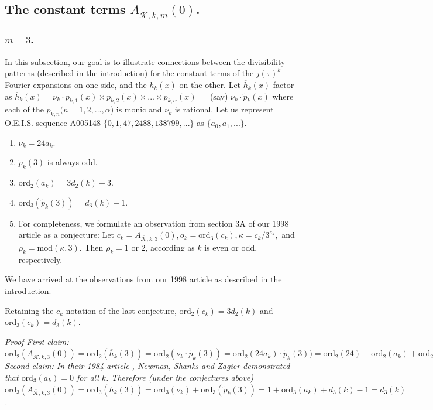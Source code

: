 \documentclass{article}
\begin{document}
\subsection[]{The constant terms 
$A_{\overline{\mathcal{K}},k,m}(0)$.
} 
\subsubsection[]{$m = 3$.}
In this subsection, our goal is to illustrate
connections between the divisibility
patterns (described in the
introduction)
for the constant terms of the
$j(\tau)^k$ Fourier expansions 
on one side,
and the $h_k(x)$ on the other.
Let $\overline{h}_k(x)$ factor as 
$\overline{h}_k(x) = 
\nu_k\cdot p_{k,1}(x) \times p_{k,2}(x) \times ...
\times p_{k,\alpha}(x) =$
(say)
$\nu_k\cdot \tilde{p}_k(x)$
where each of the $p_{k,n} (n = 1, 2,...,
\alpha$) is monic and $\nu_k$
is rational. 
Let us represent O.E.I.S.
sequence A005148 \cite{OEISNewmanShanks}  
$\{0, 1, 47, 2488, 138799, ...\}$
as $\{a_0, a_1, ...\}$.
\begin{conjecture}
\begin{enumerate}
\item
$\nu_k = 24a_k$.
\item $\tilde{p}_k(3)$
is always odd.
\item
$\text{ord}_2(a_k) = 3d_2(k)-3$.
\item
$\text{ord}_3(\tilde{p}_k(3)) = 
d_3(k) - 1$.
\item
For completeness, we formulate an 
observation from section 3A
of our 1998 article 
\cite{brent1998quadratic}
as a conjecture:
Let $c_k = A_{\overline{\mathcal{K}},k,3}(0), 
o_k=\text{ord}_3(c_k), 
\kappa=c_k/3^{o_k},$ and
$\rho_k = \text{mod}(\kappa,3)$.
Then $\rho_k = 1$ or $2$,
according as $k$ is even or odd, 
respectively.
\end{enumerate}
\end{conjecture} \noindent
We have arrived at the observations from
our 1998 article as described in the introduction.
\begin{corollary}
Retaining the $c_k$ notation of 
the last conjecture,
$\text{ord}_2(c_k) = 
3d_2(k)$
and
$\text{ord}_3(c_k)=d_3(k)$.
\end{corollary} \noindent
\it{Proof} \rm \thinspace
First claim:
$\text{ord}_2(A_{\overline{\mathcal{K}},k,3}(0)) =
\text{ord}_2(\overline{h}_k(3)) =
\text{ord}_2(\nu_k \cdot \tilde{p}_k(3)) =
\text{ord}_2(24 a_k) \cdot \tilde{p}_k(3)) =
\text{ord}_2(24) + \text{ord}_2(a_k)+ 
\text{ord}_2(\tilde{p}_k(3)) =
3 + 3d_2(k)-3 + 0 = 3d_2(k).$
 Second claim:
In their 1984 article 
\cite{newman2004sequence},
Newman, Shanks and Zagier demonstrated
that
$\text{ord}_3(a_k) = 0$
for all $k$.
Therefore (under the conjectures above)
$\text{ord}_3(A_{\overline{\mathcal{K}},k,3}(0))
=\text{ord}_3(\overline{h}_k(3)) =
\text{ord}_3(\nu_k) +
\text{ord}_3(\tilde{p}_k(3)) =
1 + \text{ord}_3(a_k) + d_3(k) - 1 =
d_3(k)$.
\end{document}
